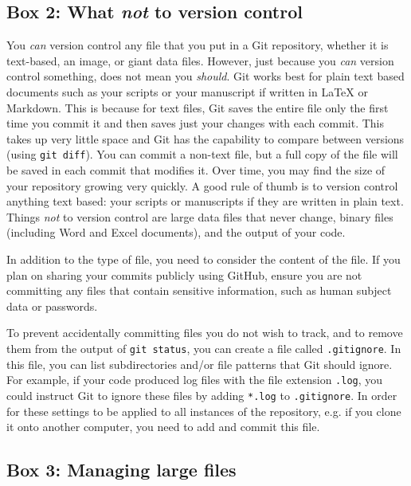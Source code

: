 \documentclass[10pt]{article}
\begin{document}
\subsection{Box 2: What \textit{not} to version control}

You \textit{can} version control any file that you put in a Git repository, whether it is text-based, an image, or giant data files. However, just because you \textit{can} version control something, does not mean you \textit{should}. Git works best for plain text based documents such as your scripts or your manuscript if written in LaTeX or Markdown. This is because for text files, Git saves the entire file only the first time you commit it and then saves just your changes with each commit. This takes up very little space and Git has the capability to compare between versions (using \verb|git diff|). You can commit a non-text file, but a full copy of the file will be saved in each commit that modifies it. Over time, you may find the size of your repository growing very quickly. A good rule of thumb is to version control anything text based: your scripts or manuscripts if they are written in plain text. Things \textit{not} to version control are large data files that never change, binary files (including Word and Excel documents), and the output of your code.

In addition to the type of file, you need to consider the content of the file.
If you plan on sharing your commits publicly using GitHub, ensure you are not committing any files that contain sensitive information, such as human subject data or passwords.

To prevent accidentally committing files you do not wish to track, and to remove them from the output of \verb|git status|, you can create a file called \verb|.gitignore|.
In this file, you can list subdirectories and/or file patterns that Git should ignore.
For example, if your code produced log files with the file extension \verb|.log|, you could instruct Git to ignore these files by adding \verb|*.log| to \verb|.gitignore|.
In order for these settings to be applied to all instances of the repository, e.g. if you clone it onto another computer, you need to add and commit this file.

  
  


\subsection{Box 3: Managing large files}
\end{document}
